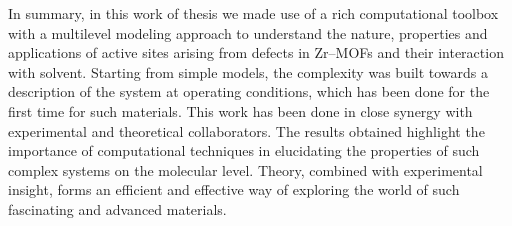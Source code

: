 \npar
In summary, in this work of thesis we made use of a rich computational toolbox with a multilevel modeling approach to understand the nature, properties and applications of active sites arising from defects in Zr--MOFs and their interaction with solvent. Starting from simple models, the complexity was built towards a description of the system at operating conditions, which has been done for the first time for such materials. 
This work has been done in close synergy with experimental and theoretical collaborators.
The results obtained highlight the importance of computational techniques in elucidating the properties of such complex systems on the molecular level. Theory, combined with experimental insight, forms an efficient and effective way of exploring the world of such fascinating and advanced materials.



